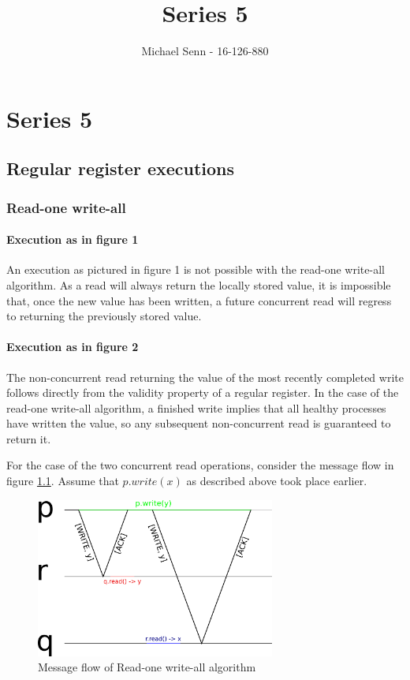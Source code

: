\documentclass[a4paper]{scrreprt}
\title{Series 5}
\author{Michael Senn \maillink{michael.senn@students.unibe.ch} - 16-126-880}
\date{\printdate}
\begin{document}
\maketitle


\setcounter{chapter}{4}

\chapter{Series 5}

\section{Regular register executions}

\subsection{Read-one write-all}

\subsubsection{Execution as in figure 1}

An execution as pictured in figure 1 is not possible with the read-one
write-all algorithm. As a read will always return the locally stored value, it
is impossible that, once the new value has been written, a future concurrent
read will regress to returning the previously stored value.

\subsubsection{Execution as in figure 2}

The non-concurrent read returning the value of the most recently completed
write follows directly from the validity property of a regular register. In the
case of the read-one write-all algorithm, a finished write implies that all
healthy processes have written the value, so any subsequent non-concurrent read
is guaranteed to return it.

For the case of the two concurrent read operations, consider the message
flow in figure \ref{fig:read_one_write_all}. Assume that $p.write(x)$ as
described above took place earlier.

\begin{figure}[h]
    \centering
    \includegraphics[width=0.7\textwidth]{res/5_1_a.png}
    \caption{Message flow of Read-one write-all algorithm}
    \label{fig:read_one_write_all}
\end{figure}
\end{document}

